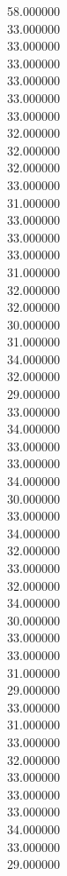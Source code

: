 58.000000\\
33.000000\\
33.000000\\
33.000000\\
33.000000\\
33.000000\\
33.000000\\
32.000000\\
32.000000\\
32.000000\\
33.000000\\
31.000000\\
33.000000\\
33.000000\\
33.000000\\
31.000000\\
32.000000\\
32.000000\\
30.000000\\
31.000000\\
34.000000\\
32.000000\\
29.000000\\
33.000000\\
34.000000\\
33.000000\\
33.000000\\
34.000000\\
30.000000\\
33.000000\\
34.000000\\
32.000000\\
33.000000\\
32.000000\\
34.000000\\
30.000000\\
33.000000\\
33.000000\\
31.000000\\
29.000000\\
33.000000\\
31.000000\\
33.000000\\
32.000000\\
33.000000\\
33.000000\\
33.000000\\
34.000000\\
33.000000\\
29.000000\\
